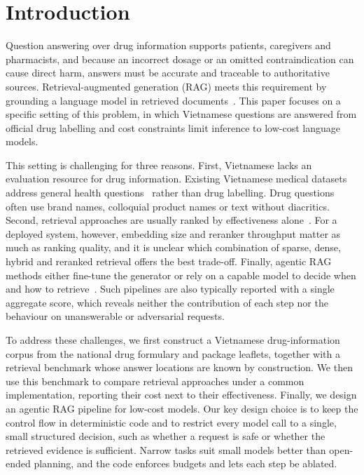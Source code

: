 \section{Introduction}\label{sec:introduction}

Question answering over drug information supports patients, caregivers and pharmacists, and because an incorrect dosage or an omitted contraindication can cause direct harm, answers must be accurate and traceable to authoritative sources. Retrieval-augmented generation (RAG) meets this requirement by grounding a language model in retrieved documents~\cite{lewis2020rag}. This paper focuses on a specific setting of this problem, in which Vietnamese questions are answered from official drug labelling and cost constraints limit inference to low-cost language models.

This setting is challenging for three reasons. First, Vietnamese lacks an evaluation resource for drug information. Existing Vietnamese medical datasets address general health questions~\cite{huy2021vimq,nguyen2022spbertqa,luu2021vicoqa} rather than drug labelling. Drug questions often use brand names, colloquial product names or text without diacritics. Second, retrieval approaches are usually ranked by effectiveness alone~\cite{thakur2021beir,muennighoff2023mteb}. For a deployed system, however, embedding size and reranker throughput matter as much as ranking quality, and it is unclear which combination of sparse, dense, hybrid and reranked retrieval offers the best trade-off. Finally, agentic RAG methods either fine-tune the generator or rely on a capable model to decide when and how to retrieve~\cite{asai2024selfrag,yan2024crag,jeong2024adaptiverag}. Such pipelines are also typically reported with a single aggregate score, which reveals neither the contribution of each step nor the behaviour on unanswerable or adversarial requests.

To address these challenges, we first construct a Vietnamese drug-information corpus from the national drug formulary and package leaflets, together with a retrieval benchmark whose answer locations are known by construction. We then use this benchmark to compare retrieval approaches under a common implementation, reporting their cost next to their effectiveness. Finally, we design an agentic RAG pipeline for low-cost models. Our key design choice is to keep the control flow in deterministic code and to restrict every model call to a single, small structured decision, such as whether a request is safe or whether the retrieved evidence is sufficient. Narrow tasks suit small models better than open-ended planning, and the code enforces budgets and lets each step be ablated.

